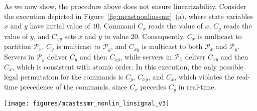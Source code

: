 \documentclass[10pt, conference, compsocconf, letterpaper]{IEEEtranv17}
\newcommand{\ppm}{\mathcal{P}}
\begin{document}
As we now show, the procedure above does not ensure linearizability.
Consider the execution depicted in Figure~\ref{fig:mcastnonlinssmr}~(a), where state variables $x$ and $y$ have initial value of $10$. 
Command $C_x$ reads the value of $x$, $C_y$ reads the value of $y$, and $C_{xy}$ sets $x$ and $y$ to value 20.
Consequently, $C_x$ is multicast to partition $\ppm_x$, $C_y$ is multicast to $\ppm_y$, and $C_{xy}$ is multicast to both $\ppm_x$ and $\ppm_y$. 
Servers in $\ppm_y$ deliver $C_y$ and then $C_{xy}$, while servers in $\ppm_x$ deliver $C_{xy}$ and then $C_x$, which is consistent with atomic order. 
In this execution, the only possible legal permutation for the commands is $C_y$, $C_{xy}$, and $C_x$, which violates the real-time precedence of the commands, since $C_x$ precedes $C_y$ in real-time.

%
\begin{figure*}
\begin{minipage}[b]{1.0\linewidth} %
\centering
      \texttt{[image: figures/mcastssmr\_nonlin\_linsignal\_v3]}
\end{minipage}
\caption{Atomic multicast and S-SMR. (To simplify the figure, we show a single replica per partition.)}
\label{fig:mcastnonlinssmr}
\end{figure*}
\end{document}
